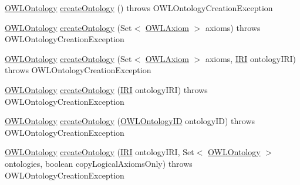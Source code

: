 \begin{DoxyCompactItemize}
\item 
\hyperlink{interfaceorg_1_1semanticweb_1_1owlapi_1_1model_1_1_o_w_l_ontology}{O\-W\-L\-Ontology} \hyperlink{interfaceorg_1_1semanticweb_1_1owlapi_1_1model_1_1_o_w_l_ontology_manager_adb106e38822201a06da0936e5f3a84c9}{create\-Ontology} ()  throws O\-W\-L\-Ontology\-Creation\-Exception
\item 
\hyperlink{interfaceorg_1_1semanticweb_1_1owlapi_1_1model_1_1_o_w_l_ontology}{O\-W\-L\-Ontology} \hyperlink{interfaceorg_1_1semanticweb_1_1owlapi_1_1model_1_1_o_w_l_ontology_manager_ab94ad2a614b6dbee807972bbb79143b6}{create\-Ontology} (Set$<$ \hyperlink{interfaceorg_1_1semanticweb_1_1owlapi_1_1model_1_1_o_w_l_axiom}{O\-W\-L\-Axiom} $>$ axioms)  throws O\-W\-L\-Ontology\-Creation\-Exception
\item 
\hyperlink{interfaceorg_1_1semanticweb_1_1owlapi_1_1model_1_1_o_w_l_ontology}{O\-W\-L\-Ontology} \hyperlink{interfaceorg_1_1semanticweb_1_1owlapi_1_1model_1_1_o_w_l_ontology_manager_a1526d917952b6eff2d355afe8227dc83}{create\-Ontology} (Set$<$ \hyperlink{interfaceorg_1_1semanticweb_1_1owlapi_1_1model_1_1_o_w_l_axiom}{O\-W\-L\-Axiom} $>$ axioms, \hyperlink{classorg_1_1semanticweb_1_1owlapi_1_1model_1_1_i_r_i}{I\-R\-I} ontology\-I\-R\-I)  throws O\-W\-L\-Ontology\-Creation\-Exception
\item 
\hyperlink{interfaceorg_1_1semanticweb_1_1owlapi_1_1model_1_1_o_w_l_ontology}{O\-W\-L\-Ontology} \hyperlink{interfaceorg_1_1semanticweb_1_1owlapi_1_1model_1_1_o_w_l_ontology_manager_a5da936373b5dee2929d124601734dbc9}{create\-Ontology} (\hyperlink{classorg_1_1semanticweb_1_1owlapi_1_1model_1_1_i_r_i}{I\-R\-I} ontology\-I\-R\-I)  throws O\-W\-L\-Ontology\-Creation\-Exception
\item 
\hyperlink{interfaceorg_1_1semanticweb_1_1owlapi_1_1model_1_1_o_w_l_ontology}{O\-W\-L\-Ontology} \hyperlink{interfaceorg_1_1semanticweb_1_1owlapi_1_1model_1_1_o_w_l_ontology_manager_a9da24de8897863f41133ede82107ff94}{create\-Ontology} (\hyperlink{classorg_1_1semanticweb_1_1owlapi_1_1model_1_1_o_w_l_ontology_i_d}{O\-W\-L\-Ontology\-I\-D} ontology\-I\-D)  throws O\-W\-L\-Ontology\-Creation\-Exception
\item 
\hyperlink{interfaceorg_1_1semanticweb_1_1owlapi_1_1model_1_1_o_w_l_ontology}{O\-W\-L\-Ontology} \hyperlink{interfaceorg_1_1semanticweb_1_1owlapi_1_1model_1_1_o_w_l_ontology_manager_ace898033f5a6a09d71380dc163f2c4bf}{create\-Ontology} (\hyperlink{classorg_1_1semanticweb_1_1owlapi_1_1model_1_1_i_r_i}{I\-R\-I} ontology\-I\-R\-I, Set$<$ \hyperlink{interfaceorg_1_1semanticweb_1_1owlapi_1_1model_1_1_o_w_l_ontology}{O\-W\-L\-Ontology} $>$ ontologies, boolean copy\-Logical\-Axioms\-Only)  throws O\-W\-L\-Ontology\-Creation\-Exception

\end{DoxyCompactItemize}
